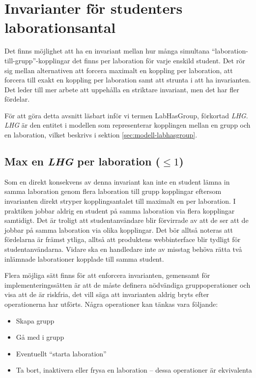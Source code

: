 \section{Invarianter för studenters laborationsantal}

Det finns möjlighet att ha en invariant mellan hur många simultana “laboration-till-grupp”-kopplingar det finns per laboration för varje enskild student. Det rör sig mellan alternativen att forcera maximalt en koppling per laboration, att forcera till exakt en koppling per laboration samt att strunta i att ha invarianten. Det leder till mer arbete att uppehålla en striktare invariant, men det har fler fördelar.

För att göra detta avsnitt läsbart inför vi termen LabHasGroup, förkortad \emph{LHG}. \emph{LHG} är den entitet i modellen som representerar kopplingen mellan en grupp och en laboration, vilket beskrivs i sektion \ref{sec:modell-labhasgroup}. 

\subsection{Max en \emph{LHG} per laboration ($\leq 1$)}
Som en direkt konsekvens av denna invariant kan inte en student lämna in samma laboration genom flera laboration till grupp kopplingar eftersom invarianten direkt stryper kopplingsantalet till maximalt en per laboration. I praktiken jobbar aldrig en student på samma laboration via flera kopplingar samtidigt. Det är troligt att studentanvändare blir förvirrade av att de ser att de jobbar på samma laboration via olika kopplingar. Det bör alltså noteras att fördelarna är främst  ytliga, alltså att produktens webbinterface blir tydligt för studentanvändarna. Vidare ska en handledare inte av misstag behöva rätta två inlämnade laborationer kopplade till samma student.

Flera möjliga sätt finns för att enforcera invarianten, gemensamt för implementeringssätten är att de måste definera nödvändiga gruppoperationer och visa att de är riskfria, det vill säga att invarianten aldrig bryts efter operationerna har utförts. Några operationer kan tänkas vara följande:

\begin{itemize}
  \item Skapa grupp
  \item Gå med i grupp
  \item Eventuellt “starta laboration”
  \item Ta bort,  inaktivera eller frysa en laboration – dessa operationer är ekvivalenta
\end{itemize} 

